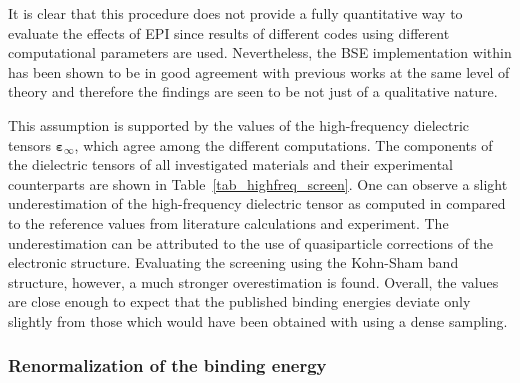 It is clear that this procedure does not provide a fully quantitative way to evaluate the effects of EPI since results of different codes using different computational parameters are used. Nevertheless, the BSE implementation within \exciting{} has been shown to be in good agreement with previous works at the same level of theory\cite{Vorwerk_2019} and therefore the findings are seen to be not just of a qualitative nature.\par
This assumption is supported by the values of the high-frequency dielectric tensors  $\boldsymbol{\varepsilon}_\infty$, which agree among the different computations. The components of the dielectric tensors of all investigated materials and their experimental counterparts are shown in Table~\ref{tab_highfreq_screen}. One can observe a slight underestimation of the high-frequency dielectric tensor as computed in \exciting{} compared to the reference values from literature calculations and experiment.  The underestimation  can be attributed to the use of quasiparticle corrections of the electronic structure. Evaluating the screening using the Kohn-Sham band structure, however, a much stronger overestimation is found. Overall, the values are close enough to expect that the published binding energies deviate only slightly from those which would have been obtained with \exciting{} using a dense sampling.
\vfill
%


\subsubsection{Renormalization of the binding energy}

